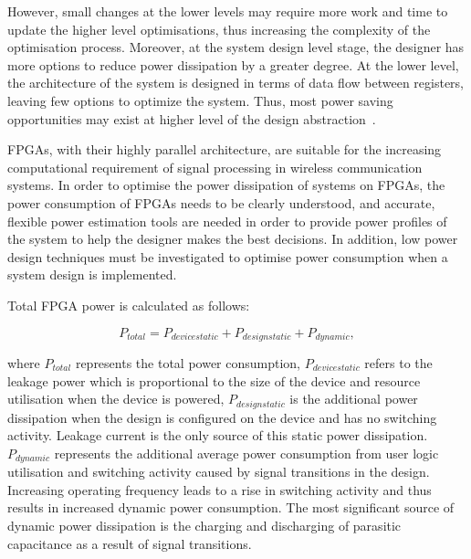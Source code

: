 However, small changes at the lower levels may require more work and time to update the higher level optimisations, thus increasing the complexity of the optimisation process.
Moreover, at the system design level stage, the designer has more options to reduce power dissipation by a greater degree.
At the lower level, the architecture of the system is designed in terms of data flow between registers, leaving few options to optimize the system.
Thus, most power saving opportunities may exist at higher level of the design abstraction~\cite{Raghunathan1998}.

FPGAs, with their highly parallel architecture, are suitable for the increasing computational requirement of signal processing in wireless communication systems.
In order to optimise the power dissipation of systems on FPGAs, the power consumption of FPGAs needs to be clearly understood, and accurate, flexible power estimation tools are needed in order to provide power profiles of the system to help the designer makes the best decisions.
In addition, low power design techniques must be investigated to optimise power consumption when a system design is implemented.
%

Total FPGA power is calculated as follows:
\begin{center}
\begin{equation}
\label{Equ:Ptotal}
 P_{\mathit{total}} = P_{\mathit{device static}} + P_{\mathit{design static}} + P_{\mathit{dynamic}},
\end{equation}
\end{center}
where $P_{\mathit{total}}$ represents the total power consumption, $P_{\mathit{device static}}$ refers to the leakage power which is proportional to the size of the device and resource utilisation when the device is powered, $P_{\mathit{design static}}$ is the additional power dissipation when the design is configured on the device and has no switching activity. Leakage current is the only source of this static power dissipation.
$P_{\mathit{dynamic}}$ represents the additional average power consumption from user logic utilisation and switching activity caused by signal transitions in the design. Increasing operating frequency leads to a rise in switching activity and thus results in increased dynamic power consumption. The most significant source of dynamic power dissipation is the charging and discharging of parasitic capacitance as a result of signal transitions.

